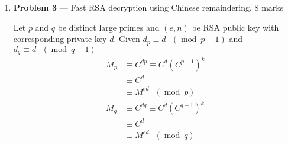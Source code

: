 \documentclass[11pt]{article}
\theoremstyle{definition}
\renewcommand{\pmod}[1]{\mbox{\ $(\ensuremath{\operatorname{mod}}\ {#1})$}}
\begin{document}
\begin{enumerate}
\begin{enumerate}
\begin{enumerate}
\begin{proof}
          \begin{align*}
            \text{\textbf{Case }} b_{i + 1} = 1 \\
            a^{s_p + 1} &\equiv a^{2s_p + b_{p + 1}} \\
                        &\equiv a^{s_p} \times a^{s_p} \times a^{b_{p + 1}} \\
                        &\equiv r^2_{p} \times a^{b_{p + 1}} \\
                        &\equiv r^2_{p} \times a \pmod{m}
          \end{align*}

          Therefore, $r_{p + 1} \equiv a^{p + 1} \pmod{m}$ and $r_i \equiv a^i \pmod{m}$
        \end{proof}
      \item
        \begin{proof}
          Given proof of $(ii)$, we can say that $a^n \equiv r_k \pmod{m}$, where $n = s_k$. Therefore,
          \begin{align*}
            a^{s_k} &\equiv a^{2s_{k - 1} + b_k} \\
                    &\equiv (a^{s_{k - 1}})^2 \times a^{b_k} \\
                    &\equiv (r_{k - 1})^2 \times a^{b_k} \\
                    &\equiv r_k \pmod{m}
          \end{align*}
        \end{proof}
    \end{enumerate}
\end{enumerate}

\newpage

\item[] \textbf{Problem 3} --- Fast RSA decryption using Chinese remaindering, 8 marks
 
Let $p$ and $q$ be distinct large primes and $(e, n)$ be RSA public key with corresponding private key $d$. Given $d_p \equiv d \pmod{p - 1}$ and $d_q \equiv d \pmod{q - 1}$
\begin{align*}
  M_p &\equiv C^{dp} \equiv C^{d}(C^{p - 1})^{k} \\
      &\equiv C^{d} \\
      &\equiv M^{ed} \pmod{p} \\
  M_q &\equiv C^{dq} \equiv C^{d}(C^{q - 1})^{k} \\
      &\equiv C^{d} \\
      &\equiv M^{ed} \pmod{q}
\end{align*}


\end{enumerate}
\end{document}
